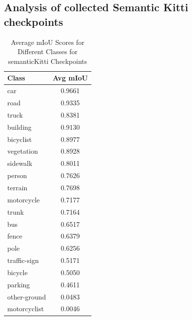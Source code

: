 \documentclass[10pt,twocolumn,letterpaper]{article}
\begin{document}
\subsection{Analysis of collected Semantic Kitti checkpoints}



\begin{table}[!h]
\centering
\begin{tabular}{l c}
\hline
Class & Avg mIoU \\
\hline
car & 0.9661 \\
road & 0.9335 \\
truck & 0.8381 \\
building & 0.9130 \\
bicyclist & 0.8977 \\
vegetation & 0.8928 \\
sidewalk & 0.8011 \\
person & 0.7626 \\
terrain & 0.7698 \\
motorcycle & 0.7177 \\
trunk & 0.7164 \\
bus & 0.6517 \\
fence & 0.6379 \\
pole & 0.6256 \\
traffic-sign & 0.5171 \\
bicycle & 0.5050 \\
parking & 0.4611 \\
other-ground & 0.0483 \\
motorcyclist & 0.0046 \\
\hline
\end{tabular}
\caption{Average mIoU Scores for Different Classes for semanticKitti Checkpoints}
\label{tab:miou_scores}
\end{table}
\end{document}
